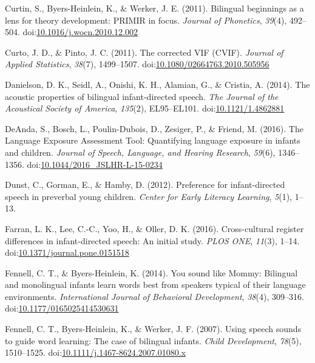 \documentclass[,man,floatsintext]{apa6}
\begin{document}
\leavevmode\hypertarget{ref-curtin_2011}{}%
Curtin, S., Byers-Heinlein, K., \& Werker, J. E. (2011). Bilingual beginnings as a lens for theory development: PRIMIR in focus. \emph{Journal of Phonetics}, \emph{39}(4), 492--504. doi:\href{https://doi.org/10.1016/j.wocn.2010.12.002}{10.1016/j.wocn.2010.12.002}

\leavevmode\hypertarget{ref-curto_2011}{}%
Curto, J. D., \& Pinto, J. C. (2011). The corrected VIF (CVIF). \emph{Journal of Applied Statistics}, \emph{38}(7), 1499--1507. doi:\href{https://doi.org/10.1080/02664763.2010.505956}{10.1080/02664763.2010.505956}

\leavevmode\hypertarget{ref-danielson_2014}{}%
Danielson, D. K., Seidl, A., Onishi, K. H., Alamian, G., \& Cristia, A. (2014). The acoustic properties of bilingual infant-directed speech. \emph{The Journal of the Acoustical Society of America}, \emph{135}(2), EL95--EL101. doi:\href{https://doi.org/10.1121/1.4862881}{10.1121/1.4862881}

\leavevmode\hypertarget{ref-deanda_2016}{}%
DeAnda, S., Bosch, L., Poulin-Dubois, D., Zesiger, P., \& Friend, M. (2016). The Language Exposure Assessment Tool: Quantifying language exposure in infants and children. \emph{Journal of Speech, Language, and Hearing Research}, \emph{59}(6), 1346--1356. doi:\href{https://doi.org/10.1044/2016_JSLHR-L-15-0234}{10.1044/2016\_JSLHR-L-15-0234}

\leavevmode\hypertarget{ref-dunst_2012}{}%
Dunst, C., Gorman, E., \& Hamby, D. (2012). Preference for infant-directed speech in preverbal young children. \emph{Center for Early Literacy Learning}, \emph{5}(1), 1--13.

\leavevmode\hypertarget{ref-farran_2016}{}%
Farran, L. K., Lee, C.-C., Yoo, H., \& Oller, D. K. (2016). Cross-cultural register differences in infant-directed speech: An initial study. \emph{PLOS ONE}, \emph{11}(3), 1--14. doi:\href{https://doi.org/10.1371/journal.pone.0151518}{10.1371/journal.pone.0151518}

\leavevmode\hypertarget{ref-fennell_2014}{}%
Fennell, C. T., \& Byers-Heinlein, K. (2014). You sound like Mommy: Bilingual and monolingual infants learn words best from speakers typical of their language environments. \emph{International Journal of Behavioral Development}, \emph{38}(4), 309--316. doi:\href{https://doi.org/10.1177/0165025414530631}{10.1177/0165025414530631}

\leavevmode\hypertarget{ref-fennell_2007}{}%
Fennell, C. T., Byers-Heinlein, K., \& Werker, J. F. (2007). Using speech sounds to guide word learning: The case of bilingual infants. \emph{Child Development}, \emph{78}(5), 1510--1525. doi:\href{https://doi.org/10.1111/j.1467-8624.2007.01080.x}{10.1111/j.1467-8624.2007.01080.x}
\end{document}
